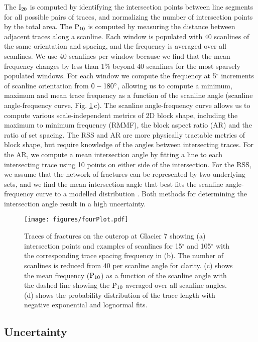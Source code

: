 \documentclass[review]{igs}
\begin{document}
The $\rm{I_{20}}$ is computed by identifying the intersection points between line segments for all possible pairs of traces, and normalizing the number of intersection points by the total area. The $\rm{P_{10}}$ is computed by measuring the distance between adjacent traces along a scanline. Each window is populated with 40 scanlines of the same orientation and spacing, and the frequency is averaged over all scanlines. We use 40 scanlines per window because we find that the mean frequency changes by less than 1\% beyond 40 scanlines for the most sparsely populated windows. For each window we compute the frequency at 5$^{\circ}$ increments of scanline orientation from $0\--180^{\circ}$, allowing us to compute a minimum, maximum and mean trace frequency as a function of the scanline angle (scanline angle-frequency curve, Fig. \ref{fp}\,c). The scanline angle-frequency curve allows us to compute various scale-independent metrics of 2D block shape, including the maximum to minimum frequency (RMMF), the block aspect ratio (AR) and the ratio of set spacing. The RSS and AR are more physically tractable metrics of block shape, but require knowledge of the angles between intersecting traces. For the AR, we compute a mean intersection angle by fitting a line to each intersecting trace using 10 points on either side of the intersection. For the RSS, we assume that the network of fractures can be represented by two underlying sets, and we find the mean intersection angle that best fits the scanline angle-frequency curve to a modelled distribution \citep[e.g.][]{Hudson1979}. Both methods for determining the intersection angle result in a high uncertainty. 

\begin{figure}[H]
  \centering
  \texttt{[image: figures/fourPlot.pdf]}
  \caption[]{Traces of fractures on the outcrop at Glacier 7 showing (a) intersection points and examples of scanlines for 15$^{\circ}$ and 105$^{\circ}$ with the corresponding trace spacing frequency in (b). The number of scanlines is reduced from 40 per scanline angle for clarity. (c) shows the mean frequency ($\rm P_{10}$) as a function of the scanline angle with the dashed line showing the $\rm P_{10}$ averaged over all scanline angles. (d) shows the probability distribution of the trace length with negative exponential and lognormal fits. }
\label{fp}
\end{figure}


\subsection{Uncertainty}
\end{document}
